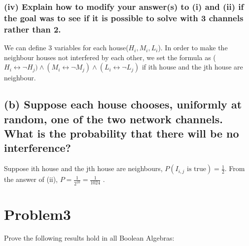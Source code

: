 \documentclass[]{article}
\begin{document}
\begin{spacing}{1.5}
		\subsubsection*{(iv) Explain how to modify your answer(s) to (i) and (ii) if the goal was to see if it is possible to solve with 3 channels rather than 2.}
		We can define 3 variables for each house($ H_i, M_i, L_i $). In order to make the neighbour houses not interfered by each other, we set the formula as ($ H_i \leftrightarrow \neg H_j ) \wedge (M_i \leftrightarrow \neg M_j ) \wedge (L_i \leftrightarrow \neg L_j ) $ if ith house and the jth house are neighbour.
		
		
		\subsection*{(b) Suppose each house chooses, uniformly at random, one of the two network channels. What is the probability that there will be no interference?}
		Suppose ith house and the jth house are neighbours, $ P(I_{i,j} \text{ is true}) = \frac{1}{2} $. From the answer of (ii), $ P = \frac{1}{2^{10}} = \frac{1}{1024}$ .
		
		\section*{Problem3 }
		Prove the following results hold in all Boolean Algebras:

\end{spacing}
\end{document}
